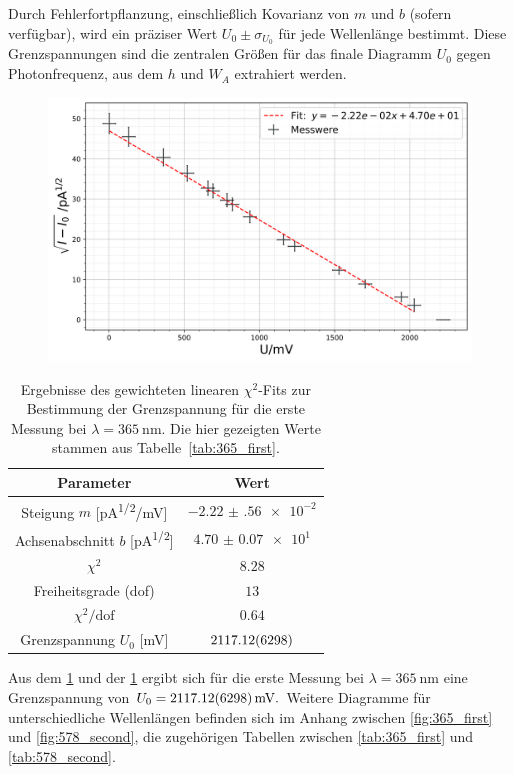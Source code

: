 Durch Fehlerfortpflanzung, einschließlich Kovarianz von $m$ und $b$ (sofern verfügbar), wird ein präziser Wert $U_{0}\pm\sigma_{U_{0}}$ für jede Wellenlänge bestimmt. Diese Grenzspannungen sind die zentralen Größen für das finale Diagramm $U_{0}$ gegen Photonfrequenz, aus dem $h$ und $W_{A}$ extrahiert werden.
\FloatBarrier
\begin{figure}[H]
    \centering
    \includegraphics[width=0.95\linewidth]{figs/365_1.png}
    \label{fig:365_first_photoeff}
\end{figure}
\begin{table}[H]
  \centering
  \begin{tabular}{|c|c|}
    \hline
    \textbf{Parameter} & \textbf{Wert} \\ \hline
    Steigung $m$ [\si{\pico\ampere^{1/2}/\milli\volt}]
      & $\num{-2.22(56)e-2}$ \\ \hline
    Achsenabschnitt $b$ [\si{\pico\ampere^{1/2}}]
      & $\num{4.70(7)e1}$ \\ \hline
    $\chi^2$
      & $\num{8.28}$ \\ \hline
    Freiheitsgrade (dof)
      & $\num{13}$ \\ \hline
    $\chi^2/\mathrm{dof}$
      & $\num{0.64}$ \\ \hline
    Grenzspannung $U_0$ [\si{\milli\volt}]
      & $\num{2117.12 \pm 62.98}$ \\ \hline
  \end{tabular}
  \caption{Ergebnisse des gewichteten linearen $\chi^2$-Fits zur Bestimmung der Grenzspannung für die erste Messung bei $\lambda=\SI{365}{\nano\metre}$. Die hier gezeigten Werte stammen aus Tabelle~\ref{tab:365_first}.}
  \label{tab:365_first_chi2_photoeff}
\end{table}
\FloatBarrier
Aus dem \cref{fig:365_first_photoeff} und der \cref{tab:365_first_chi2_photoeff} ergibt sich für die erste Messung bei $\lambda = \SI{365}{\nano\meter}$ eine Grenzspannung von $U_0 = \SI{2117.12 \pm 62.98}{\milli\volt}.$ Weitere Diagramme für unterschiedliche Wellenlängen befinden sich im Anhang zwischen \cref{fig:365_first} und \cref{fig:578_second}, die zugehörigen Tabellen zwischen \cref{tab:365_first} und \cref{tab:578_second}.\\


